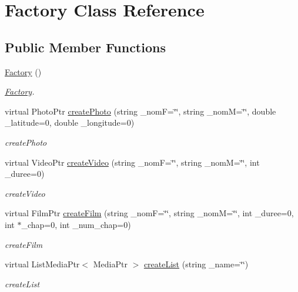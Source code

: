 \hypertarget{classFactory}{\section{Factory Class Reference}
\label{classFactory}
}
\subsection*{Public Member Functions}
\begin{DoxyCompactItemize}
\item 
\hyperlink{classFactory_ac792bf88cfb7b6804b479529da5308cc}{Factory} ()
\begin{DoxyCompactList}\small\item\em \hyperlink{classFactory}{Factory}. \end{DoxyCompactList}\item 
virtual Photo\+Ptr \hyperlink{classFactory_adceba4e3ec5f562f8c763df4a4867e5c}{create\+Photo} (string \+\_\+nom\+F=\char`\"{}\char`\"{}, string \+\_\+nom\+M=\char`\"{}\char`\"{}, double \+\_\+latitude=0, double \+\_\+longitude=0)
\begin{DoxyCompactList}\small\item\em create\+Photo \end{DoxyCompactList}\item 
virtual Video\+Ptr \hyperlink{classFactory_af9d206c8e60d86c56b00d16edcc5bf4d}{create\+Video} (string \+\_\+nom\+F=\char`\"{}\char`\"{}, string \+\_\+nom\+M=\char`\"{}\char`\"{}, int \+\_\+duree=0)
\begin{DoxyCompactList}\small\item\em create\+Video \end{DoxyCompactList}\item 
virtual Film\+Ptr \hyperlink{classFactory_aa123d5c1891fe01e10b529e6569fa867}{create\+Film} (string \+\_\+nom\+F=\char`\"{}\char`\"{}, string \+\_\+nom\+M=\char`\"{}\char`\"{}, int \+\_\+duree=0, int $\ast$\+\_\+chap=0, int \+\_\+num\+\_\+chap=0)
\begin{DoxyCompactList}\small\item\em create\+Film \end{DoxyCompactList}\item 
virtual List\+Media\+Ptr$<$ Media\+Ptr $>$ \hyperlink{classFactory_a76454621c8e60b827df3b2ef12160a19}{create\+List} (string \+\_\+name=\char`\"{}\char`\"{})
\begin{DoxyCompactList}\small\item\em create\+List \end{DoxyCompactList}\item 

\end{DoxyCompactItemize}
